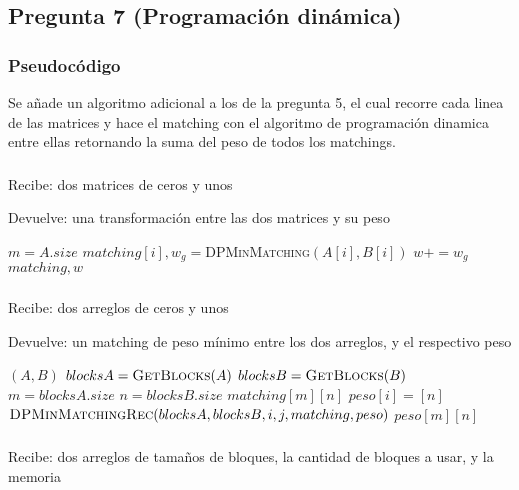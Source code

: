 \subsection*{Pregunta 7 (Programación dinámica)}
\subsubsection*{Pseudocódigo}
Se añade un algoritmo adicional a los de la pregunta 5, el cual recorre cada linea de las matrices y hace el matching con el algoritmo de programación dinamica entre ellas retornando la suma del peso de todos los matchings.

\subsubsection*{}
Recibe: dos matrices de ceros y unos

Devuelve: una transformación entre las dos matrices y su peso
\begin{algorithmic}[1]
  \STATE $m=A.size$
    \STATE $matching[i],w_g=${\textsc{DPMinMatching}$(A[i], B[i])$}
    \STATE $w+=w_g$
  \ENDFOR
  \RETURN $matching,w$
   
\end{algorithmic}
\subsubsection*{}

Recibe: dos arreglos de ceros y unos

Devuelve: un matching de peso mínimo entre los dos arreglos, y el respectivo peso
\begin{algorithmic}[1]
  $(A,B)$
  \STATE $blocksA = \textsc{GetBlocks$(A)$}$
  \STATE $blocksB = \textsc{GetBlocks$(B)$}$
  \STATE $m = blocksA.size$
  \STATE $n = blocksB.size$
  \STATE $matching[m][n]$
    \STATE $peso[i]=[n]$
        \STATE $\textsc{DPMinMatchingRec$(blocksA,blocksB,i,j,matching,peso)$}$
    \ENDFOR
  \ENDFOR
  \RETURN $peso[m][n]$
\end{algorithmic}
\subsubsection*{}
Recibe: dos arreglos de tamaños de bloques, la cantidad de bloques a usar, y la memoria

